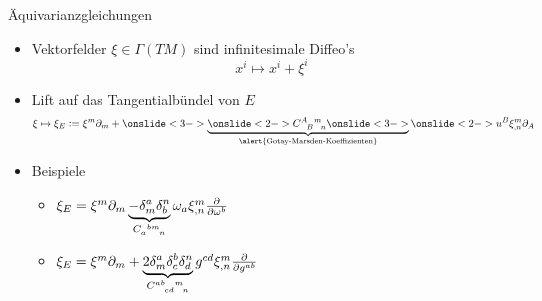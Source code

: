\documentclass{beamer}
\newcommand{\gmc}[4]{\ensuremath{C^{#1\hphantom{#2}#3}_{\hphantom{#1}{#2}\hphantom{#3}#4}}}
\newcommand{\gmcd}[4]{\ensuremath{C_{#1\hphantom{#2#3}#4}^{\hphantom{#1}{#2}#3}}}
\begin{document}
    \begin{frame}{\"Aquivarianzgleichungen}
        \begin{itemize}
            \item<1-> Vektorfelder $\xi\in\Gamma(TM)$ sind infinitesimale Diffeo's \[ x^i \mapsto x^i + \xi^i \]
            \item<2-> Lift auf das Tangentialbündel von $E$ \[ \xi \mapsto \xi_E \vcentcolon= \xi^m\partial_m + \onslide<3-> \underbrace{\onslide<2-> \gmc{A}{B}{m}{n} \onslide<3-> }_{\mathclap{\text{\alert{Gotay-Marsden-Koeffizienten}}}} \onslide<2-> u^B \xi^m_{,n} \partial_A \]
            \item<4-> Beispiele
            \begin{itemize}
                \item<4->  $\xi_E  =\xi^m \partial_m \underbrace{- \delta^a_m \delta^n_b}_{\gmcd{a}{b}{m}{n}} \omega_a \xi^m_{,n} \frac{\partial}{\partial \omega^b} $
                \item<4->  $\xi_E  =\xi^m \partial_m + \underbrace{2 \delta^a_m \delta^b_c \delta^n_d}_{\gmc{ab}{cd}{m}{n}} g^{cd} \xi^m_{,n} \frac{\partial}{\partial g^{ab}} $
            \end{itemize}
        \end{itemize}
    \end{frame}
\end{document}
